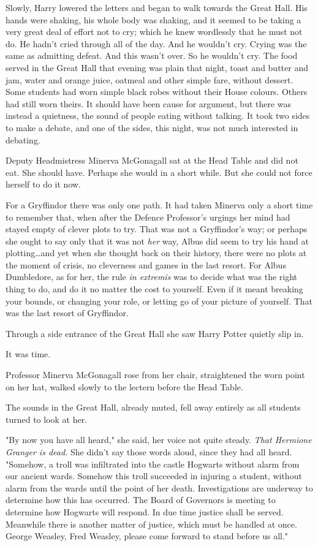 Slowly, Harry lowered the letters and began to walk towards the Great Hall. His
hands were shaking, his whole body was shaking, and it seemed to be taking a
very great deal of effort not to cry; which he knew wordlessly that he must not
do. He hadn't cried through all of the day. And he wouldn't cry. Crying was the
same as admitting defeat. And this wasn't over. So he wouldn't cry.
\later
The food served in the Great Hall that evening was plain that night, toast and
butter and jam, water and orange juice, oatmeal and other simple fare, without
dessert. Some students had worn simple black robes without their House colours.
Others had still worn theirs. It should have been cause for argument, but there
was instead a quietness, the sound of people eating without talking. It took
two sides to make a debate, and one of the sides, this night, was not much
interested in debating.

Deputy Headmistress Minerva McGonagall sat at the Head Table and did not eat.
She should have. Perhaps she would in a short while. But she could not force
herself to do it now.

For a Gryffindor there was only one path. It had taken Minerva only a short
time to remember that, when after the Defence Professor's urgings her mind had
stayed empty of clever plots to try. That was not a Gryffindor's way; or
perhaps she ought to say only that it was not \emph{her} way, Albus did seem to
try his hand at plotting…and yet when she thought back on their
history, there were no plots at the moment of crisis, no cleverness and games
in the last resort. For Albus Dumbledore, as for her, the rule \emph{in
extremis} was to decide what was the right thing to do, and do it no matter the
cost to yourself. Even if it meant breaking your bounds, or changing your role,
or letting go of your picture of yourself. That was the last resort of
Gryffindor.

Through a side entrance of the Great Hall she saw Harry Potter quietly slip in.

It was time.

Professor Minerva McGonagall rose from her chair, straightened the worn point
on her hat, walked slowly to the lectern before the Head Table.

The sounds in the Great Hall, already muted, fell away entirely as all students
turned to look at her.

"By now you have all heard," she said, her voice not quite steady. \emph{That
Hermione Granger is dead.} She didn't say those words aloud, since they had all
heard. "Somehow, a troll was infiltrated into the castle Hogwarts without alarm
from our ancient wards. Somehow this troll succeeded in injuring a student,
without alarm from the wards until the point of her death. Investigations are
underway to determine how this has occurred. The Board of Governors is meeting
to determine how Hogwarts will respond. In due time justice shall be served.
Meanwhile there is another matter of justice, which must be handled at once.
George Weasley, Fred Weasley, please come forward to stand before us all."

